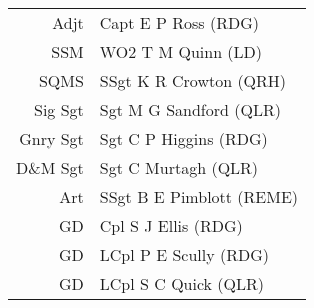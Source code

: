 \begin{center}
  \begin{tabular}{rl}
    Adjt & Capt E P Ross (RDG) \\
    SSM & WO2 T M Quinn (LD) \\
    SQMS & SSgt K R Crowton (QRH) \\
    Sig Sgt & Sgt M G Sandford (QLR) \\
    Gnry Sgt & Sgt C P Higgins (RDG) \\
    D\&M Sgt & Sgt C Murtagh (QLR) \\
    Art & SSgt B E Pimblott (REME) \\
    GD & Cpl S J Ellis (RDG) \\
    GD & LCpl P E Scully (RDG) \\
    GD & LCpl S C Quick (QLR) \\
  \end{tabular}
\end{center}
